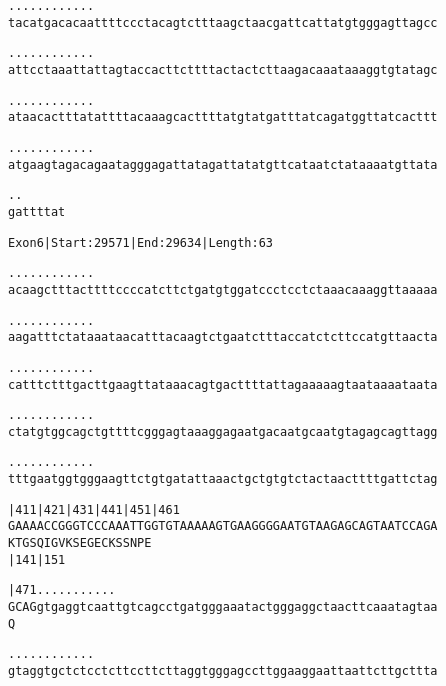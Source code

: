 \documentclass{article}
\begin{document}
\newpage
\begin{alltt}
  .    .    .    .    .    .    .    .    .    .    .    .
tacatgacacaattttccctacagtctttaagctaacgattcattatgtgggagttagcc



  .    .    .    .    .    .    .    .    .    .    .    .
attcctaaattattagtaccacttcttttactactcttaagacaaataaaggtgtatagc



  .    .    .    .    .    .    .    .    .    .    .    .
ataacactttatattttacaaagcacttttatgtatgatttatcagatggttatcacttt



  .    .    .    .    .    .    .    .    .    .    .    .
atgaagtagacagaatagggagattatagattatatgttcataatctataaaatgttata



  .    .
gattttat


\end{alltt}
\newpage
\begin{alltt}
Exon 6 | Start: 29571 | End: 29634 | Length: 63

.    .    .    .    .    .    .    .    .    .    .    .
acaagctttacttttccccatcttctgatgtggatccctcctctaaacaaaggttaaaaa



.    .    .    .    .    .    .    .    .    .    .    .
aagatttctataaataacatttacaagtctgaatctttaccatctcttccatgttaacta



.    .    .    .    .    .    .    .    .    .    .    .
catttctttgacttgaagttataaacagtgacttttattagaaaaagtaataaaataata



.    .    .    .    .    .    .    .    .    .    .    .
ctatgtggcagctgttttcgggagtaaaggagaatgacaatgcaatgtagagcagttagg



.    .    .    .    .    .    .    .    .    .    .    .
tttgaatggtgggaagttctgtgatattaaactgctgtgtctactaacttttgattctag



|411      |421      |431      |441      |451      |461
GAAAACCGGGTCCCAAATTGGTGTAAAAAGTGAAGGGGAATGTAAGAGCAGTAATCCAGA
 K  T  G  S  Q  I  G  V  K  S  E  G  E  C  K  S  S  N  P  E
          |141                          |151

|471    .    .    .    .    .    .    .    .    .    .    .
GCAGgtgaggtcaattgtcagcctgatgggaaatactgggaggctaacttcaaatagtaa
 Q


   .    .    .    .    .    .    .    .    .    .    .    .
gtaggtgctctcctcttccttcttaggtgggagccttggaaggaattaattcttgcttta



\end{alltt}
\end{document}
